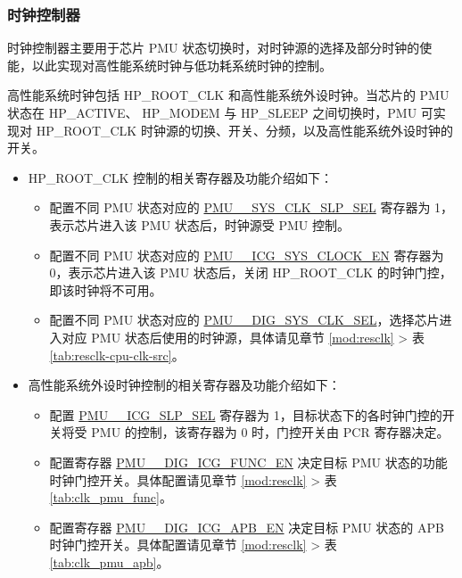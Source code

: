 \documentclass[main\_\_CN.tex]{subfiles}
\begin{document}
\subsubsection{时钟控制器}

时钟控制器主要用于芯片 PMU 状态切换时，对时钟源的选择及部分时钟的使能，以此实现对高性能系统时钟与低功耗系统时钟的控制。

高性能系统时钟包括 HP\_ROOT\_CLK 和高性能系统外设时钟。当芯片的 PMU 状态在 HP\_ACTIVE、 HP\_MODEM 与 HP\_SLEEP 之间切换时，PMU 可实现对 HP\_ROOT\_CLK 时钟源的切换、开关、分频，以及高性能系统外设时钟的开关。


\begin{itemize}

\item HP\_ROOT\_CLK 控制的相关寄存器及功能介绍如下：

    \begin{itemize}
    \item 配置不同 PMU 状态对应的 \hyperref[fielddesc:PMUHPACTIVESYSCLKSLPSEL]{PMU\_\_SYS\_CLK\_SLP\_SEL} 寄存器为 1，表示芯片进入该 PMU 状态后，时钟源受 PMU 控制。

    \item 配置不同 PMU 状态对应的 \hyperref[fielddesc:PMUHPACTIVEICGSYSCLOCKEN]{PMU\_\_ICG\_SYS\_CLOCK\_EN} 寄存器为 0，表示芯片进入该 PMU 状态后，关闭 HP\_ROOT\_CLK 的时钟门控，即该时钟将不可用。

    \item 配置不同 PMU 状态对应的 \hyperref[fielddesc:PMUHPACTIVEDIGSYSCLKSEL]{PMU\_\_DIG\_SYS\_CLK\_SEL}，选择芯片进入对应 PMU 状态后使用的时钟源，具体请见章节 \ref{mod:resclk} \textit{} > 表 \ref{tab:resclk-cpu-clk-src}。
    \end{itemize}

\item 高性能系统外设时钟控制的相关寄存器及功能介绍如下：

    \begin{itemize}
    \item 配置 \hyperref[fielddesc:PMUHPACTIVEICGSLPSEL]{PMU\_\_ICG\_SLP\_SEL} 寄存器为 1，目标状态下的各时钟门控的开关将受 PMU 的控制，该寄存器为 0 时，门控开关由 PCR 寄存器决定。

    \item 配置寄存器 \hyperref[fielddesc:PMUHPACTIVEDIGICGFUNCEN]{PMU\_\_DIG\_ICG\_FUNC\_EN} 决定目标 PMU 状态的功能时钟门控开关。具体配置请见章节 \ref{mod:resclk} \textit{} > 表 \ref{tab:clk_pmu_func}。

    \item 配置寄存器 \hyperref[fielddesc:PMUHPACTIVEDIGICGAPBEN]{PMU\_\_DIG\_ICG\_APB\_EN} 决定目标 PMU 状态的 APB 时钟门控开关。具体配置请见章节 \ref{mod:resclk} \textit{} > 表 \ref{tab:clk_pmu_apb}。

    \end{itemize}

\end{itemize}
\end{document}
